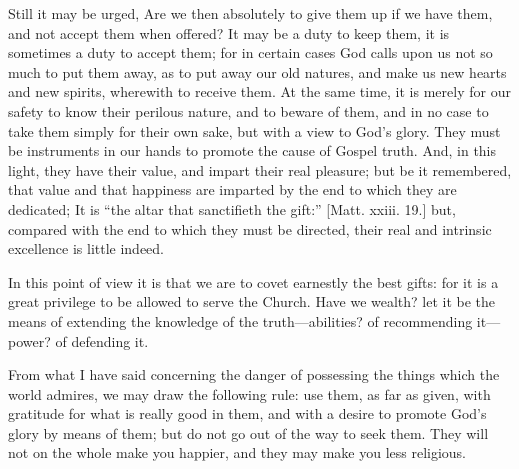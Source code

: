 Still it may be urged, Are we then absolutely to give them up if we
have them, and not accept them when offered? It may be a duty to keep
them, it is sometimes a duty to accept them; for in certain cases God
calls upon us not so much to put them away, as to put away our old
natures, and make us new hearts and new spirits, wherewith to receive
them. At the same time, it is merely for our safety to know their
perilous nature, and to beware of them, and in no case to take them
simply for their own sake, but with a view to God's glory. They must
be instruments in our hands to promote the cause of Gospel truth. And,
in this light, they have their value, and impart their real pleasure;
but be it remembered, that value and that happiness are imparted by
the end to which they are dedicated; It is ``the altar that
sanctifieth the gift:'' [Matt. xxiii. 19.] but, compared with the
end to which they must be directed, their real and intrinsic
excellence is little indeed.

In this point of view it is that we are to covet earnestly the best
gifts: for it is a great privilege to be allowed to serve the Church.
Have we wealth? let it be the means of extending the knowledge of the
truth—abilities? of recommending it—power? of defending it.

From what I have said concerning the danger of possessing the
things which the world admires, we may draw the following rule: use
them, as far as given, with gratitude for what is really good in them,
and with a desire to promote God's glory by means of them; but do not
go out of the way to seek them. They will not on the whole make you
happier, and they may make you less religious.

